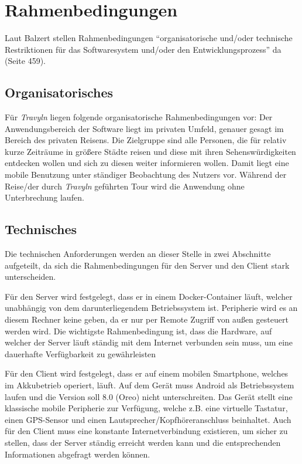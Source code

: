 \section{Rahmenbedingungen}
Laut Balzert stellen Rahmenbedingungen \enquote{organisatorische und/oder technische Restriktionen für das Softwaresystem und/oder den Entwicklungsprozess} da \cite{Balzert.2009} (Seite 459).

\subsection{Organisatorisches}
Für \textit{Travyln} liegen folgende organisatorische Rahmenbedingungen vor: Der Anwendungsbereich der Software liegt im privaten Umfeld, genauer gesagt im Bereich des privaten Reisens. Die Zielgruppe sind alle Personen, die für relativ kurze Zeiträume in größere Städte reisen und diese mit ihren Sehenswürdigkeiten entdecken wollen und sich zu diesen weiter informieren wollen. Damit liegt eine mobile Benutzung unter ständiger Beobachtung des Nutzers vor. Während der Reise/der durch \textit{Travyln} geführten Tour wird die Anwendung ohne Unterbrechung laufen.

\subsection{Technisches}

Die technischen Anforderungen werden an dieser Stelle in zwei Abschnitte aufgeteilt, da sich die Rahmenbedingungen für den Server und den Client stark unterscheiden. 

\vspace{0.25cm}

Für den Server wird festgelegt, dass er in einem Docker-Container\cite{Turnbull.2014} läuft, welcher unabhängig von dem darunterliegendem Betriebssystem ist. Peripherie wird es an diesem Rechner keine geben, da er nur per Remote Zugriff von außen gesteuert werden wird. Die wichtigste Rahmenbedingung ist, dass die Hardware, auf welcher der Server läuft ständig mit dem Internet verbunden sein muss, um eine dauerhafte Verfügbarkeit zu gewährleisten

\vspace{0.25cm}

Für den Client wird festgelegt, dass er auf einem mobilen Smartphone, welches im Akkubetrieb operiert, läuft. Auf dem Gerät muss Android als Betriebssystem laufen und die Version soll 8.0 (Oreo) nicht unterschreiten. Das Gerät stellt eine klassische mobile Peripherie zur Verfügung, welche z.B. eine virtuelle Tastatur, einen GPS-Sensor und einen Lautsprecher/Kopfhöreranschluss beinhaltet. Auch für den Client muss eine konstante Internetverbindung existieren, um sicher zu stellen, dass der Server ständig erreicht werden kann und die entsprechenden Informationen abgefragt werden können.

